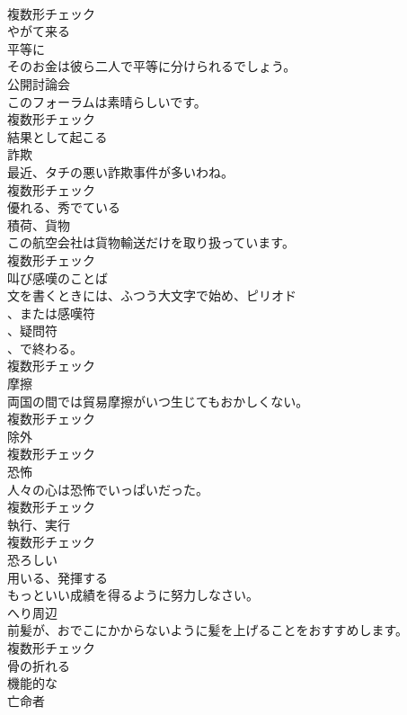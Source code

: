 \documentclass[8pt]{extreport}
\begin{document}
\begin{CJK}{UTF8}{min}
\\	複数形チェック
\\	[形容詞]	やがて来る	
\\	[副詞]	平等に	
\\	そのお金は彼ら二人で平等に分けられるでしょう。	
\\	[名詞]	公開討論会	
\\	このフォーラムは素晴らしいです。	
\\	複数形チェック
\\	[形容詞]	結果として起こる	
\\	[名詞]	詐欺	
\\	最近、タチの悪い詐欺事件が多いわね。	
\\	複数形チェック
\\	[動詞]	優れる、秀でている	
\\	[名詞]	積荷、貨物	
\\	この航空会社は貨物輸送だけを取り扱っています。	
\\	複数形チェック
\\	[名詞]	叫び感嘆のことば	
\\	文を書くときには、ふつう大文字で始め、ピリオド
\\	、または感嘆符
\\	、疑問符
\\	、で終わる。	
\\	複数形チェック
\\	[名詞]	摩擦	
\\	両国の間では貿易摩擦がいつ生じてもおかしくない。	
\\	複数形チェック
\\	[名詞]	除外	
\\	複数形チェック
\\	[名詞]	恐怖	
\\	人々の心は恐怖でいっぱいだった。	
\\	複数形チェック
\\	[名詞]	執行、実行	
\\	複数形チェック
\\	[形容詞]	恐ろしい	
\\	[動詞]	用いる、発揮する	
\\	もっといい成績を得るように努力しなさい。	
\\	[名詞]	へり周辺	
\\	前髪が、おでこにかからないように髪を上げることをおすすめします。	
\\	複数形チェック
\\	[形容詞]	骨の折れる	
\\	[形容詞]	機能的な	
\\	[名詞]	亡命者	

\end{CJK}
\end{document}

